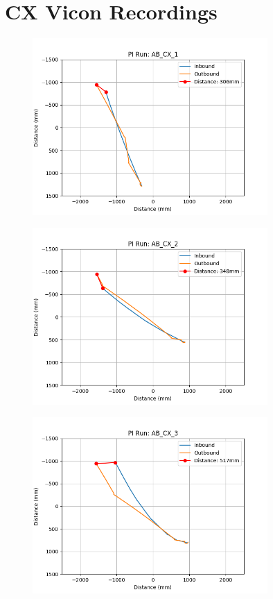 \documentclass[a4paper,11pt,twoside,openright]{article}
\let\oldsection\section
\def\section{\cleardoublepage\oldsection}
\begin{document}
\section{CX Vicon Recordings}\label{ap:cxfigs}
\begin{figure}[h!]
  \centering
  \includegraphics[width=0.8\textwidth]{AB_CX_1}
  \caption{\label{fig:abcx1}}
\end{figure}

\begin{figure}[h!]
  \centering
  \includegraphics[width=0.8\textwidth]{AB_CX_2}
  \caption{\label{fig:abcx2}}
\end{figure}

\begin{figure}[h!]
  \centering
  \includegraphics[width=0.8\textwidth]{AB_CX_3}
  \caption{\label{fig:abcx3}}
\end{figure}
\end{document}
